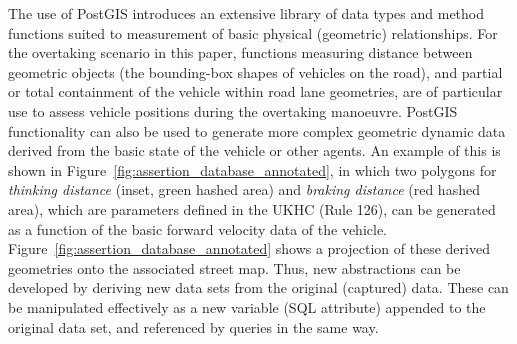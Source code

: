 The use of PostGIS introduces an extensive library of data types and method functions suited to measurement of basic physical (geometric) relationships. For the overtaking scenario in this paper, functions measuring distance between geometric objects (the bounding-box shapes of vehicles on the road), and partial or total containment of the vehicle within road lane geometries, are of particular use to assess vehicle positions during the overtaking manoeuvre. 
%
PostGIS functionality can also be used to generate more complex geometric dynamic data derived from the basic state of the vehicle or other agents. An example of this is shown in Figure~\ref{fig:assertion_database_annotated}, in which two polygons for \textit{thinking distance} (inset, green hashed area) and \textit{braking distance} (red hashed area), which are parameters defined in the UKHC (Rule 126), can be generated as a function of the basic forward velocity data of the vehicle. Figure~\ref{fig:assertion_database_annotated} shows a projection of these derived geometries onto the associated street map. 
%
Thus, new abstractions can be developed by deriving new data sets from the original (captured) data. These can be manipulated effectively as a new variable (SQL attribute) appended to the original data set, and referenced by queries in the same way.
%



